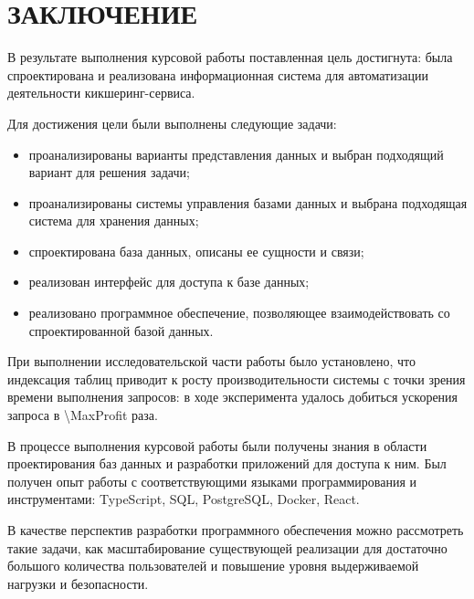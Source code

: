 \chapter*{ЗАКЛЮЧЕНИЕ}

В результате выполнения курсовой работы поставленная цель достигнута: была спроектирована и реализована информационная система для автоматизации деятельности кикшеринг-сервиса.

Для достижения цели были выполнены следующие задачи:

\begin{itemize}
    \item проанализированы варианты представления данных и выбран подходящий вариант для решения задачи;
    \item проанализированы системы управления базами данных и выбрана подходящая система для хранения данных;
    \item спроектирована база данных, описаны ее сущности и связи;
    \item реализован интерфейс для доступа к базе данных;
    \item реализовано программное обеспечение, позволяющее взаимодействовать со спроектированной базой данных.
\end{itemize}

При выполнении исследовательской части работы было установлено,
что индексация таблиц приводит к росту производительности системы
с точки зрения времени выполнения запросов: в ходе эксперимента удалось добиться ускорения запроса в \num[round-precision=0]{\MaxProfit} раза.

В процессе выполнения курсовой работы были получены знания в области проектирования баз данных и разработки приложений для доступа к ним. Был получен опыт работы с соответствующими языками программирования и инструментами: TypeScript, SQL, PostgreSQL, Docker, React.

В качестве перспектив разработки программного обеспечения можно рассмотреть такие задачи, как масштабирование существующей реализации для достаточно большого количества пользователей и повышение уровня выдерживаемой нагрузки и безопасности.